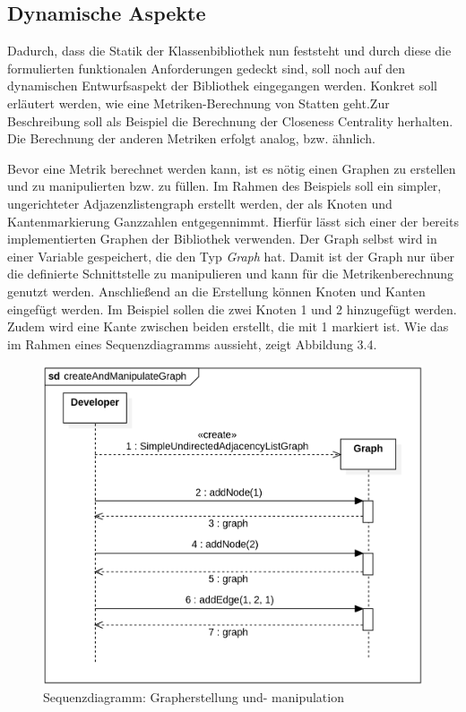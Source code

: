\documentclass[a4paper,12pt,ngerman,chapterprefix=false,listof=totoc,bibliography=totoc]{scrreprt}
\begin{document}
{{\subsection{Dynamische Aspekte}
{
Dadurch, dass die Statik der Klassenbibliothek nun feststeht und durch diese die formulierten funktionalen Anforderungen gedeckt sind, soll noch auf den dynamischen Entwurfsaspekt der Bibliothek eingegangen werden. Konkret soll erläutert werden, wie eine Metriken-Berechnung von Statten geht.Zur Beschreibung soll als Beispiel die Berechnung der Closeness Centrality herhalten. Die Berechnung der anderen Metriken erfolgt analog, bzw. ähnlich.

Bevor eine Metrik berechnet werden kann, ist es nötig einen Graphen zu erstellen und zu manipulierten bzw. zu füllen. Im Rahmen des Beispiels soll ein simpler, ungerichteter Adjazenzlistengraph erstellt werden, der als Knoten und Kantenmarkierung Ganzzahlen entgegennimmt. Hierfür lässt sich einer der bereits implementierten Graphen der Bibliothek verwenden. Der Graph selbst wird in einer Variable gespeichert, die den Typ \textit{Graph} hat. Damit ist der Graph nur über die definierte Schnittstelle zu manipulieren und kann für die Metrikenberechnung genutzt werden. Anschließend an die Erstellung können Knoten und Kanten eingefügt werden. Im Beispiel sollen die zwei Knoten 1 und 2 hinzugefügt werden. Zudem wird eine Kante zwischen beiden erstellt, die mit 1 markiert ist. Wie das im Rahmen eines Sequenzdiagramms aussieht, zeigt Abbildung 3.4.
\begin{figure}[ht!]
	\centering
	\includegraphics[scale=.38]{Abbildungen/UML/sequence_graph_creation.png}
	\caption[Sequenzdiagramm: Grapherstellung und- manipulation]{Sequenzdiagramm: Grapherstellung und- manipulation}
\end{figure}

}}}
\end{document}
